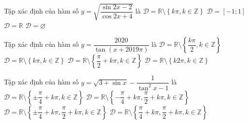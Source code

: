 \begin{ex}%
	Tập xác định của hàm số $y=\sqrt{\dfrac{\sin 2x-2}{\cos 2x+4}}$  là
	 \choice
		{$\mathscr{D}=\mathbb{R}\setminus \left\{k\pi,  k\in \mathbb{Z}\right\}$}
		 {$\mathscr{D}=\left[-1; 1\right]$}
		{$\mathscr{D}=\mathbb{R}$} 
		{\True $\mathscr{D}=\varnothing$} 
\end{ex}

\begin{ex}%
	 Tập xác định của hàm số $y=\dfrac{2020}{\tan (x+2019\pi)}$ là
	 \choice
		 {$\mathscr{D}=\mathbb{R}\setminus\left\{\dfrac{k\pi}{2} ,k\in\mathbb{Z}\right\}$}
		 {\True $\mathscr{D}=\mathbb{R}\setminus\left\{ k\pi ,k\in\mathbb{Z}\right\}$}
		 {$\mathscr{D}=\mathbb{R}\setminus\left\{\dfrac{\pi}{2}+k\pi ,k\in\mathbb{Z}\right\}$}
		 {$\mathscr{D}=\mathbb{R}\setminus\left\{k2\pi ,k\in\mathbb{Z}\right\}$}
\end{ex}

\begin{ex}%
	Tập xác định của hàm số  $y=\sqrt{3+\sin x}-\dfrac{1}{\tan ^2x-1}$ là
	 \choice
		{$\mathscr{D}=\mathbb{R}\setminus \left\{\pm \dfrac{\pi}{4}+k\pi,  k\in \mathbb{Z}\right\}$}
		{$\mathscr{D}=\mathbb{R}\setminus \left\{-\dfrac{\pi}{4}+k\pi, \dfrac{\pi}{2}+k\pi, k\in  \mathbb{Z}\right\}$}
		{\True $\mathscr{D}=\mathbb{R}\setminus  \left\{\pm \dfrac{\pi}{4}+k\pi, \dfrac{\pi}{2}+k\pi, k\in \mathbb{Z}\right\}$}
		 {$\mathscr{D}=\mathbb{R}\setminus \left\{\dfrac{\pi}{4}+k\pi, \dfrac{\pi}{2}+k\pi, k\in \mathbb{Z}\right\}$}
\end{ex}

